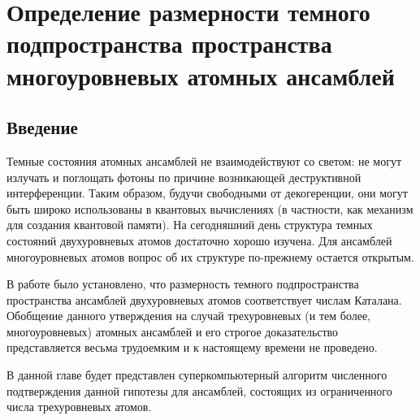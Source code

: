 \chapter{Определение размерности темного подпространства пространства многоуровневых атомных ансамблей}\label{ch:ch4}

\section{Введение}\label{sec:ch4/sect1}

Темные состояния атомных ансамблей не взаимодействуют со светом: не могут излучать и
поглощать фотоны по причине возникающей деструктивной интерференции. Таким образом, будучи свободными от декогеренции, они могут быть широко использованы в квантовых вычислениях (в частности, как механизм для создания квантовой памяти). На сегодняшний день структура темных состояний двухуровневых атомов достаточно хорошо изучена. Для ансамблей многоуровневых атомов вопрос об их структуре по-прежнему остается открытым.

В работе \cite{dark_states_dimension} было установлено, что размерность темного подпространства пространства ансамблей двухуровневых атомов соответствует числам Каталана. Обобщение данного утверждения на случай трехуровневых (и тем более, многоуровневых) атомных ансамблей и его строгое доказательство представляется весьма трудоемким и к настоящему времени не проведено.

В данной главе будет представлен суперкомпьютерный алгоритм численного подтверждения данной гипотезы для ансамблей, состоящих из ограниченного числа трехуровневых
атомов.

